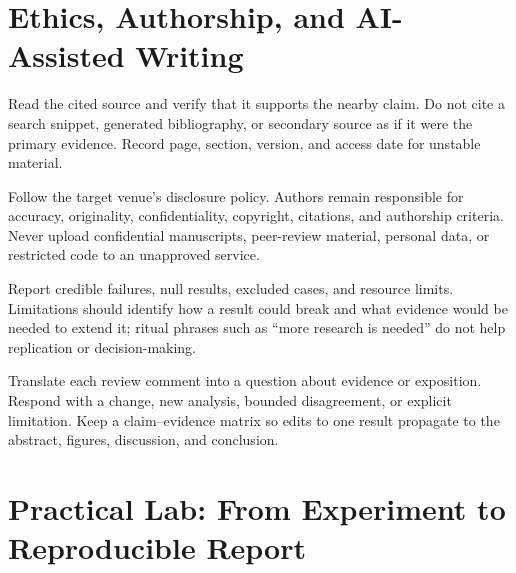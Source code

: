 \section{Ethics, Authorship, and AI-Assisted Writing}

\begin{tcbitemize}[skin=sectionraster]
\tcbitem[title={Citation Integrity},raster multicolumn=3]
Read the cited source and verify that it supports the nearby claim.
Do not cite a search snippet, generated bibliography, or secondary source as
if it were the primary evidence.
Record page, section, version, and access date for unstable material.

\tcbitem[title={AI Assistance},raster multicolumn=3]
Follow the target venue's disclosure policy.
Authors remain responsible for accuracy, originality, confidentiality,
copyright, citations, and authorship criteria.
Never upload confidential manuscripts, peer-review material, personal data,
or restricted code to an unapproved service.

\tcbitem[title={Negative Results and Limitations},raster multicolumn=3]
Report credible failures, null results, excluded cases, and resource limits.
Limitations should identify how a result could break and what evidence would
be needed to extend it; ritual phrases such as ``more research is needed'' do
not help replication or decision-making.

\tcbitem[title={Review and Rebuttal},raster multicolumn=3]
Translate each review comment into a question about evidence or exposition.
Respond with a change, new analysis, bounded disagreement, or explicit
limitation.
Keep a claim--evidence matrix so edits to one result propagate to the abstract,
figures, discussion, and conclusion.
\end{tcbitemize}

\section{Practical Lab: From Experiment to Reproducible Report}

